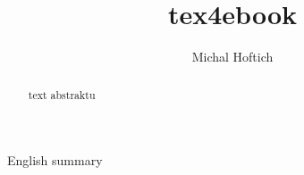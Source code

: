 \documentclass{csbulletin}
\begin{document}
\author{Michal Hoftich}
\title{tex4ebook}

\maketitle
\begin{abstract}
text abstraktu
\end{abstract}


\begin{summary}
  English summary
\end{summary}
\end{document}
